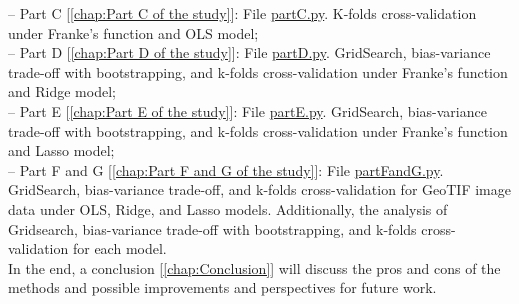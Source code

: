 -- Part C [\ref{chap:Part C of the study}]: File \href{https://github.com/fabiorodp/UiO-FYS-STK4155/blob/master/Project1/partC.py}{partC.py}. K-folds cross-validation under Franke's function and OLS model;\\

-- Part D [\ref{chap:Part D of the study}]: File \href{https://github.com/fabiorodp/UiO-FYS-STK4155/blob/master/Project1/partD.py}{partD.py}. GridSearch, bias-variance trade-off with bootstrapping, and k-folds cross-validation under Franke's function and Ridge model;\\

-- Part E [\ref{chap:Part E of the study}]: File \href{https://github.com/fabiorodp/UiO-FYS-STK4155/blob/master/Project1/partE.py}{partE.py}. GridSearch, bias-variance trade-off with bootstrapping, and k-folds cross-validation under Franke's function and Lasso model;\\

-- Part F and G [\ref{chap:Part F and G of the study}]: File \href{https://github.com/fabiorodp/UiO-FYS-STK4155/blob/master/Project1/partFandG.py}{partFandG.py}. GridSearch, bias-variance trade-off, and k-folds cross-validation for GeoTIF image data under OLS, Ridge, and Lasso models. Additionally, the analysis of Gridsearch, bias-variance trade-off with bootstrapping, and k-folds cross-validation for each model.\\

In the end, a conclusion [\ref{chap:Conclusion}] will discuss the pros and cons of the methods and possible improvements and perspectives for future work.\\
